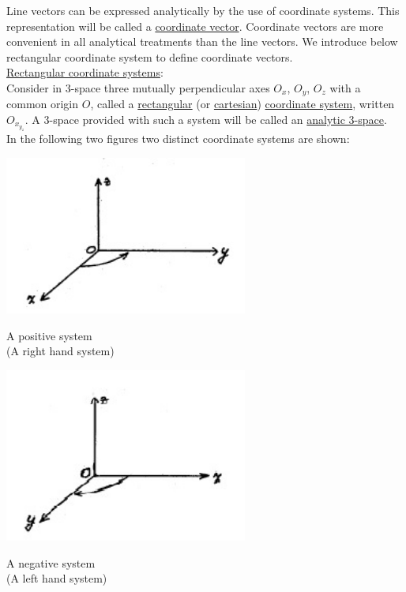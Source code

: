 \documentclass{amsbook}
\begin{document}
    
    Line vectors can be expressed analytically by the use of coordinate systems. This representation will be called a \underline{coordinate vector}. Coordinate vectors are more convenient in all analytical treatments than the line vectors. We introduce below rectangular coordinate system to define coordinate vectors.\\
    
    \underline{Rectangular coordinate systems}:\\
    
    Consider in 3-space three mutually perpendicular axes $O_x$, $O_y$, $O_z$ with a common origin $O$, called a \underline{rectangular} (or \underline{cartesian}) \underline{coordinate system}, written $O_x_y_z$. A 3-space provided with such a system will be called an \underline{analytic 3-space}.\\
    
    In the following two figures two distinct coordinate systems are shown:\\
    
    \begin{minipage}[c]{0.5\textwidth}
            \includegraphics[width=0.6\textwidth]{images/b2p1-119-fig01.jpg}
            \begin{center}
                \raggedright\caption{A positive system\\ (A right hand system)}
            \end{center}
    \end{minipage}
    \hfill
    \begin{minipage}[c]{0.5\textwidth}
            \includegraphics[width=0.6\textwidth]{images/b2p1-119-fig02.jpg}
            \begin{center}
                \raggedright\caption{A negative system \\ (A left hand system)}
            \end{center}
    \end{minipage}\\ \\
    
\end{document}
